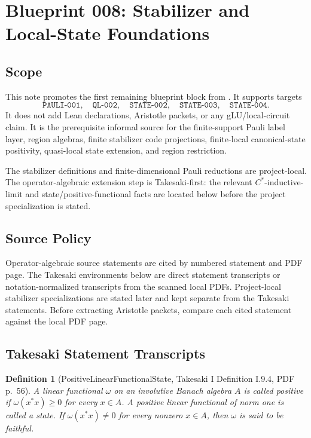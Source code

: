 \documentclass{article}
\newtheorem{definition}{Definition}
\begin{document}
\section*{Blueprint 008: Stabilizer and Local-State Foundations}

\subsection*{Scope}

This note promotes the first remaining blueprint block from
.  It supports
targets
\[
  \texttt{PAULI-001},\quad
  \texttt{QL-002},\quad
  \texttt{STATE-002},\quad
  \texttt{STATE-003},\quad
  \texttt{STATE-004}.
\]
It does not add Lean declarations, Aristotle packets, or any gLU/local-circuit
claim.  It is the prerequisite informal source for the finite-support Pauli
label layer, region algebras, finite stabilizer code projections,
finite-local canonical-state positivity, quasi-local state extension, and
region restriction.

The stabilizer definitions and finite-dimensional Pauli reductions are
project-local.  The operator-algebraic extension step is Takesaki-first:
the relevant \(C^*\)-inductive-limit and state/positive-functional facts are
located below before the project specialization is stated.

\subsection*{Source Policy}

Operator-algebraic source statements are cited by numbered statement and PDF
page.  The Takesaki environments below are direct statement transcripts or
notation-normalized transcripts from the scanned local PDFs.  Project-local
stabilizer specializations are stated later and kept separate from the
Takesaki statements.  Before extracting Aristotle packets, compare each cited
statement against the local PDF page.

\subsection*{Takesaki Statement Transcripts}

\begin{definition}[PositiveLinearFunctionalState, Takesaki I Definition I.9.4, PDF p.~56]
A linear functional \(\omega\) on an involutive Banach algebra \(A\) is called
positive if \(\omega(x^*x)\geq 0\) for every \(x\in A\).  A positive linear
functional of norm one is called a state.  If
\(\omega(x^*x)\neq 0\) for every nonzero \(x\in A\), then \(\omega\) is said
to be faithful.
\end{definition}
\end{document}

